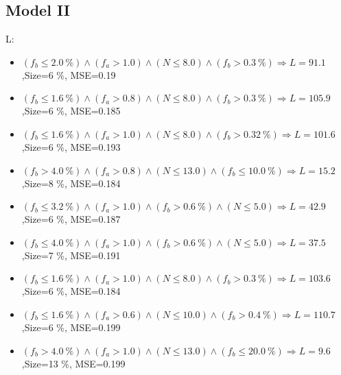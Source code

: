\documentclass[numbered]{CSL}
\begin{document}
\subsection{Model II}
L:
\begin{itemize}
\item $(f_b \leq 2.0~\%) \land (f_a > 1.0) \land (N \leq 8.0) \land (f_b > 0.3~\%) \Rightarrow L = 91.1$,\hfill Size=6 \%, MSE=0.19
\item $(f_b \leq 1.6~\%) \land (f_a > 0.8) \land (N \leq 8.0) \land (f_b > 0.3~\%) \Rightarrow L = 105.9$,\hfill Size=6 \%, MSE=0.185
\item $(f_b \leq 1.6~\%) \land (f_a > 1.0) \land (N \leq 8.0) \land (f_b > 0.32~\%) \Rightarrow L = 101.6$,\hfill Size=6 \%, MSE=0.193
\item $(f_b > 4.0~\%) \land (f_a > 0.8) \land (N \leq 13.0) \land (f_b \leq 10.0~\%) \Rightarrow L = 15.2$,\hfill Size=8 \%, MSE=0.184
\item $(f_b \leq 3.2~\%) \land (f_a > 1.0) \land (f_b > 0.6~\%) \land (N \leq 5.0) \Rightarrow L = 42.9$,\hfill Size=6 \%, MSE=0.187
\item $(f_b \leq 4.0~\%) \land (f_a > 1.0) \land (f_b > 0.6~\%) \land (N \leq 5.0) \Rightarrow L = 37.5$,\hfill Size=7 \%, MSE=0.191
\item $(f_b \leq 1.6~\%) \land (f_a > 1.0) \land (N \leq 8.0) \land (f_b > 0.3~\%) \Rightarrow L = 103.6$,\hfill Size=6 \%, MSE=0.184
\item $(f_b \leq 1.6~\%) \land (f_a > 0.6) \land (N \leq 10.0) \land (f_b > 0.4~\%) \Rightarrow L = 110.7$,\hfill Size=6 \%, MSE=0.199
\item $(f_b > 4.0~\%) \land (f_a > 1.0) \land (N \leq 13.0) \land (f_b \leq 20.0~\%) \Rightarrow L = 9.6$,\hfill Size=13 \%, MSE=0.199
\end{itemize}
\end{document}
